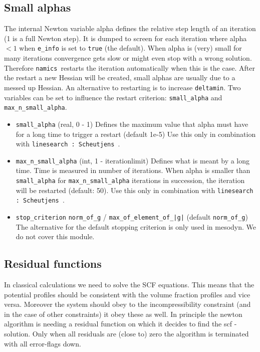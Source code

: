\documentclass{article}
\newcommand{\namics}{{\tt namics}}
\begin{document}
\subsection{Small alphas}
\label{sec:smallalpha}
The internal Newton variable alpha defines the relative step length of an iteration (1 is a full Newton step).  It is dumped to screen for each iteration where alpha $< 1$ when {\tt e\_info} is set to {\tt true} (the default).  When alpha is (very) small for many iterations convergence gets slow or might even stop with a wrong solution. Therefore \namics\ restarts the iteration automatically when this is the case.  After the restart a new Hessian will be created, small alphas are usually due to a messed up Hessian.  An alternative to restarting is to increase {\tt deltamin}.  Two variables can be set to influence the restart criterion: {\tt small\_alpha} and {\tt max\_n\_small\_alpha}. 
\begin{itemize}

\item{\tt small\_alpha} (real, 0 - 1) Defines the maximum value that alpha must have for a long time to trigger a restart (default 1e-5) Use this only in combination with {\tt linesearch : Scheutjens }.

\item {\tt max\_n\_small\_alpha} (int, 1 - iterationlimit) Defines what is meant by a long time.  Time is measured in number of iterations.  When alpha is smaller than {\tt small\_alpha} for {\tt max\_n\_small\_alpha} iterations in succession, the iteration will be restarted (default: 50). Use this only in combination with {\tt linesearch : Scheutjens }.
 

\item {\tt stop\_criterion} {\tt norm\_of\_g} / {\tt max\_of\_element\_of\_|g|} (default {\tt norm\_of\_g}) The alternative for the default stopping criterion is only used in mesodyn. We do not cover this module. 
\end{itemize}

\subsection{Residual functions}
In classical calculations we need to solve the SCF equations. This means that the potential profiles should be consistent with the volume fraction profiles and vice versa. Moreover the system should obey to the incompressibility constraint (and in the case of other constraints) it obey these as well. In principle the newton algorithm is needing a residual function on which it decides to find the scf - solution. Only when all residuals are (close to) zero the algorithm is terminated with all error-flags down. 
\end{document}
